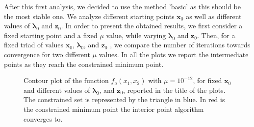 \documentclass[a4paper,11pt]{article}
\begin{document}
\noindent After this first analysis, we decided to use the method 'basic' as this should be the most stable one. We analyze different starting points $\textbf{x}_{0}$ as well as different  values of $\boldsymbol{\lambda}_{0}$ and $\textbf{z}_{0}$. 
In order to present the obtained results, we first consider a fixed starting point and a fixed $\mu$ value, while varying $\boldsymbol{\lambda}_{0}$ and $\textbf{z}_{0}$. Then, for a fixed triad of values $\textbf{x}_{0}$, $\boldsymbol{\lambda}_{0}$, and $\textbf{z}_{0}$ , we compare the number of iterations towards convergence for two different $\mu$ values. In all the plots we report the intermediate points as they reach the constrained minimum point.
\begin{figure}[H]
	\centering
	\caption{Contour plot of the function $f_{a}(x_{1},x_{2})$ with $\mu=10^{-12}$, for fixed $\textbf{x}_{0}$ and different values of $\boldsymbol{\lambda}_{0}$, and $\textbf{z}_{0}$, reported in the title of the plots. The constrained set is represented by the triangle in blue. In red is the constrained minimum point the interior point algorithm converges to.}
	\label{Fig:func_a}
\end{figure}
\end{document}
